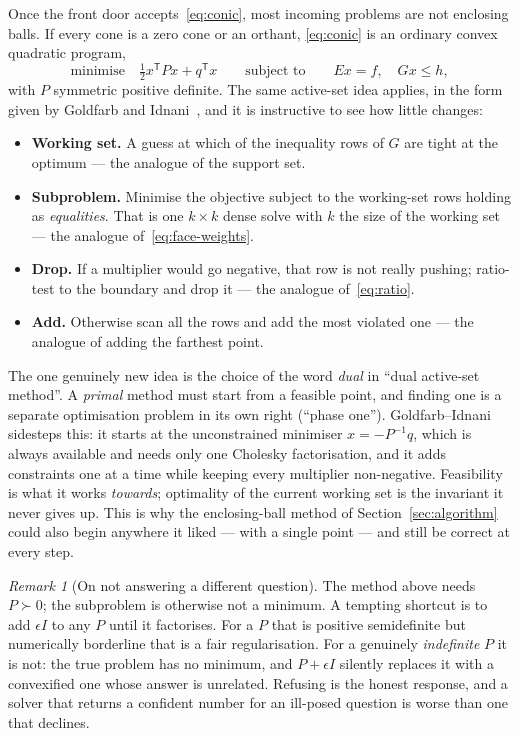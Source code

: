 \documentclass[11pt,a4paper]{article}
\theoremstyle{plain}
\theoremstyle{definition}
\theoremstyle{remark}
\newtheorem*{remark}{Remark}
\newcommand{\transpose}{^{\mathsf{T}}}
\begin{document}
Once the front door accepts~\eqref{eq:conic}, most incoming problems are not
enclosing balls. If every cone is a zero cone or an orthant, \eqref{eq:conic} is
an ordinary convex quadratic program,
\begin{equation}
  \label{eq:qp}
  \text{minimise}\quad \tfrac12 x\transpose P x + q\transpose x
  \qquad\text{subject to}\qquad E x = f, \quad G x \le h,
\end{equation}
with $P$ symmetric positive definite. The same active-set idea applies, in the
form given by Goldfarb and Idnani~\cite{goldfarb1983}, and it is instructive to
see how little changes:
\begin{itemize}
  \item \textbf{Working set.} A guess at which of the inequality rows of $G$ are
    tight at the optimum --- the analogue of the support set.
  \item \textbf{Subproblem.} Minimise the objective subject to the working-set
    rows holding as \emph{equalities}. That is one $k\times k$ dense solve with
    $k$ the size of the working set --- the analogue
    of~\eqref{eq:face-weights}.
  \item \textbf{Drop.} If a multiplier would go negative, that row is not really
    pushing; ratio-test to the boundary and drop it --- the analogue
    of~\eqref{eq:ratio}.
  \item \textbf{Add.} Otherwise scan all the rows and add the most violated one
    --- the analogue of adding the farthest point.
\end{itemize}

The one genuinely new idea is the choice of the word \emph{dual} in ``dual
active-set method''. A \emph{primal} method must start from a feasible point, and
finding one is a separate optimisation problem in its own right (``phase one'').
Goldfarb--Idnani sidesteps this: it starts at the unconstrained minimiser
$x=-P^{-1}q$, which is always available and needs only one Cholesky
factorisation, and it adds constraints one at a time while keeping every
multiplier non-negative. Feasibility is what it works \emph{towards}; optimality
of the current working set is the invariant it never gives up. This is why the
enclosing-ball method of Section~\ref{sec:algorithm} could also begin anywhere it
liked --- with a single point --- and still be correct at every step.

\begin{remark}[On not answering a different question]
  The method above needs $P\succ0$; the subproblem is otherwise not a minimum.
  A tempting shortcut is to add $\epsilon I$ to any $P$ until it factorises. For
  a $P$ that is positive semidefinite but numerically borderline that is a fair
  regularisation. For a genuinely \emph{indefinite} $P$ it is not: the true
  problem has no minimum, and $P+\epsilon I$ silently replaces it with a
  convexified one whose answer is unrelated. Refusing is the honest response,
  and a solver that returns a confident number for an ill-posed question is worse
  than one that declines.
\end{remark}
\end{document}
